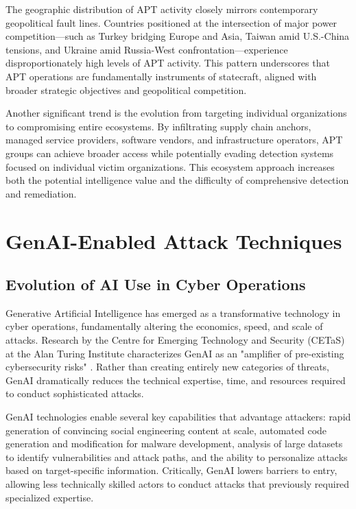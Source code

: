 The geographic distribution of APT activity closely mirrors contemporary geopolitical fault lines. Countries positioned at the intersection of major power competition—such as Turkey bridging Europe and Asia, Taiwan amid U.S.-China tensions, and Ukraine amid Russia-West confrontation—experience disproportionately high levels of APT activity. This pattern underscores that APT operations are fundamentally instruments of statecraft, aligned with broader strategic objectives and geopolitical competition.

Another significant trend is the evolution from targeting individual organizations to compromising entire ecosystems. By infiltrating supply chain anchors, managed service providers, software vendors, and infrastructure operators, APT groups can achieve broader access while potentially evading detection systems focused on individual victim organizations. This ecosystem approach increases both the potential intelligence value and the difficulty of comprehensive detection and remediation.

\section{GenAI-Enabled Attack Techniques}

\subsection{Evolution of AI Use in Cyber Operations}

Generative Artificial Intelligence has emerged as a transformative technology in cyber operations, fundamentally altering the economics, speed, and scale of attacks. Research by the Centre for Emerging Technology and Security (CETaS) at the Alan Turing Institute characterizes GenAI as an "amplifier of pre-existing cybersecurity risks" \cite{cetas2024}. Rather than creating entirely new categories of threats, GenAI dramatically reduces the technical expertise, time, and resources required to conduct sophisticated attacks.

GenAI technologies enable several key capabilities that advantage attackers: rapid generation of convincing social engineering content at scale, automated code generation and modification for malware development, analysis of large datasets to identify vulnerabilities and attack paths, and the ability to personalize attacks based on target-specific information. Critically, GenAI lowers barriers to entry, allowing less technically skilled actors to conduct attacks that previously required specialized expertise.

